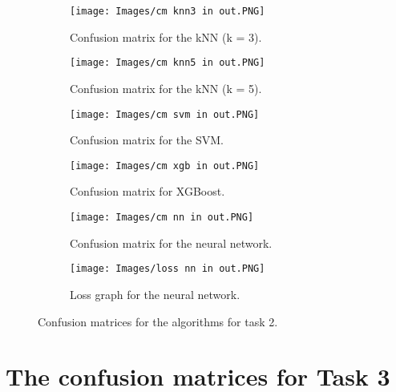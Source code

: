 \documentclass{article}
\begin{document}
%
\begin{figure}[ht]
\centering
\begin{subfigure}{.45\textwidth}
\centering
\texttt{[image: Images/cm knn3 in out.PNG]}
\caption{Confusion matrix for the kNN (k = 3).}
\end{subfigure}
\hfill
\begin{subfigure}{.45\textwidth}
\centering
\texttt{[image: Images/cm knn5 in out.PNG]}
\caption{Confusion matrix for the kNN (k = 5).}
\end{subfigure}
\medskip

\begin{subfigure}{.45\textwidth}
\centering
\texttt{[image: Images/cm svm in out.PNG]}
\caption{Confusion matrix for the SVM.}
\end{subfigure}
\hfill
\begin{subfigure}{.45\textwidth}
\centering
\texttt{[image: Images/cm xgb in out.PNG]}
\caption{Confusion matrix for XGBoost.}
\end{subfigure}
\medskip

\begin{subfigure}{.45\textwidth}
\centering
\texttt{[image: Images/cm nn in out.PNG]}
\caption{Confusion matrix for the neural network.}
\end{subfigure}
\hfill
\begin{subfigure}{.45\textwidth}
\centering
\texttt{[image: Images/loss nn in out.PNG]}
\caption{Loss graph for the neural network.}
\end{subfigure}

\caption{Confusion matrices for the algorithms for task 2.}
\label{fig:cm_in_out}
\end{figure}
%

\clearpage
\section{The confusion matrices for Task 3}
\label{appendix:CM3}
\end{document}
